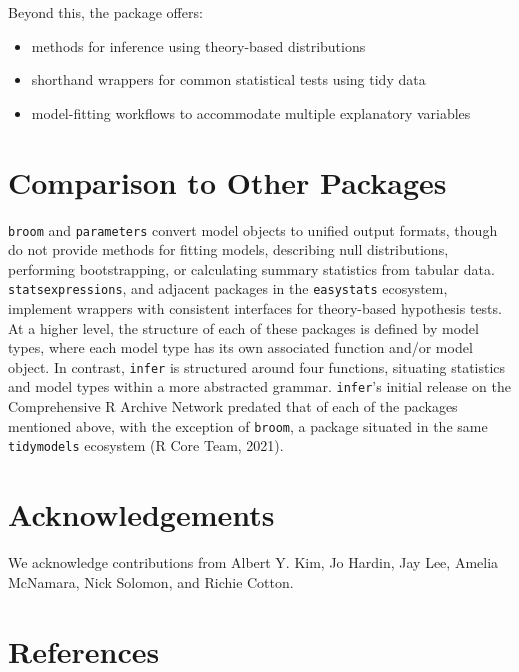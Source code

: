 \documentclass[10pt,a4paper,onecolumn]{article}
\providecommand{\tightlist}{%
  \setlength{\itemsep}{0pt}\setlength{\parskip}{0pt}}
\begin{document}
Beyond this, the package offers:

\begin{itemize}
\tightlist
\item
  methods for inference using theory-based distributions
\item
  shorthand wrappers for common statistical tests using tidy data
\item
  model-fitting workflows to accommodate multiple explanatory variables
\end{itemize}

\hypertarget{comparison-to-other-packages}{%
\section{Comparison to Other
Packages}\label{comparison-to-other-packages}}

\texttt{broom} and \texttt{parameters} convert model objects to unified
output formats, though do not provide methods for fitting models,
describing null distributions, performing bootstrapping, or calculating
summary statistics from tabular data. \texttt{statsexpressions}, and
adjacent packages in the \texttt{easystats} ecosystem, implement
wrappers with consistent interfaces for theory-based hypothesis tests.
At a higher level, the structure of each of these packages is defined by
model types, where each model type has its own associated function
and/or model object. In contrast, \texttt{infer} is structured around
four functions, situating statistics and model types within a more
abstracted grammar. \texttt{infer}'s initial release on the
Comprehensive R Archive Network predated that of each of the packages
mentioned above, with the exception of \texttt{broom}, a package
situated in the same \texttt{tidymodels} ecosystem (R Core Team, 2021).

\hypertarget{acknowledgements}{%
\section{Acknowledgements}\label{acknowledgements}}

We acknowledge contributions from Albert Y. Kim, Jo Hardin, Jay Lee,
Amelia McNamara, Nick Solomon, and Richie Cotton.

\hypertarget{references}{%
\section*{References}\label{references}}
\end{document}
